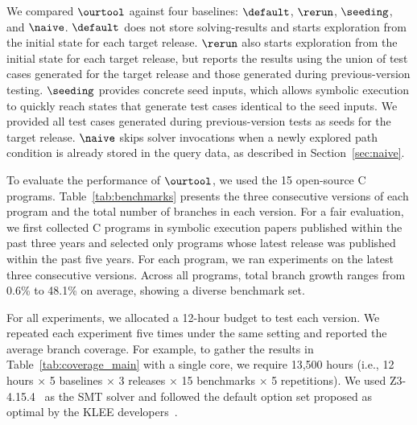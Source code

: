 We compared $\ourtool$ against four baselines: $\default$, $\rerun$, $\seeding$, and $\naive$. $\default$ does not store solving-results and starts exploration from the initial state for each target release. $\rerun$ also starts exploration from the initial state for each target release, but reports the results using the union of test cases generated for the target release and those generated during previous-version testing. $\seeding$ provides concrete seed inputs, which allows symbolic execution to quickly reach states that generate test cases identical to the seed inputs. We provided all test cases generated during previous-version tests as seeds for the target release. $\naive$ skips solver invocations when a newly explored path condition is already stored in the query data, as described in Section~\ref{sec:naive}.


To evaluate the performance of $\ourtool$, we used the 15 open-source C programs. Table~\ref{tab:benchmarks} presents the three consecutive versions of each program and the total number of branches in each version. For a fair evaluation, we first collected C programs in symbolic execution papers published within the past three years and selected only programs whose latest release was published within the past five years. For each program, we ran experiments on the latest three consecutive versions. Across all programs, total branch growth ranges from 0.6\% to 48.1\% on average, showing a diverse benchmark set.

For all experiments, we allocated a 12-hour budget to test each version. We repeated each experiment five times under the same setting and reported the average branch coverage. For example, to gather the results in Table~\ref{tab:coverage_main} with a single core, we require 13,500 hours (i.e., 12 hours $\times$ 5 baselines $\times$ 3 releases $\times$ 15 benchmarks $\times$ 5 repetitions). We used Z3-4.15.4~\cite{z32008} as the SMT solver and followed the default option set proposed as optimal by the KLEE developers~\cite{osdiexperiment}.
